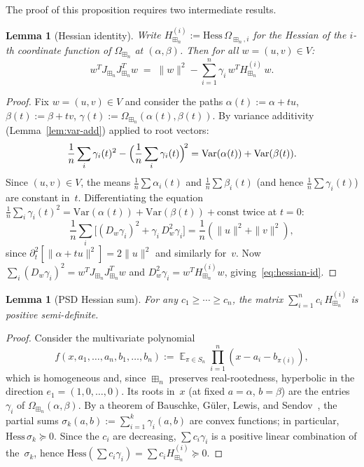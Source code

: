 \documentclass[10pt,a4paper]{amsart}
\theoremstyle{plain}
\newtheorem{lemma}[theorem]{Lemma}
\theoremstyle{definition}
\theoremstyle{remark}
\newcommand{\fp}{\boxplus_n}
\begin{document}
The proof of this proposition requires two
intermediate results.

\begin{lemma}[Hessian identity]
\label{lem:hessian-id}
Write $H^{(i)}_{\fp}:=\mathrm{Hess}\,\Omega_{\fp,i}$
for the Hessian of the $i$-th coordinate function
of $\Omega_{\fp}$ at $(\alpha,\beta)$.
Then for all $w=(u,v)\in V$:
\begin{equation}\label{eq:hessian-id}
  w^T J_{\fp}J_{\fp}^T w
  \;=\;\|w\|^2
  -\sum_{i=1}^n\gamma_i\,w^T H^{(i)}_{\fp}\,w.
\end{equation}
\end{lemma}

\begin{proof}
Fix $w=(u,v)\in V$ and consider the paths
$\alpha(t):=\alpha+tu$, $\beta(t):=\beta+tv$,
$\gamma(t):=\Omega_{\fp}(\alpha(t),\beta(t))$.
By variance additivity (Lemma~\ref{lem:var-add})
applied to root vectors:
\[
  \frac{1}{n}\sum_i\gamma_i(t)^2
  -\Bigl(\frac{1}{n}\sum_i\gamma_i(t)\Bigr)^{\!2}
  =\mathrm{Var}(\alpha(t))+\mathrm{Var}(\beta(t)).
\]
Since $(u,v)\in V$, the means
$\frac{1}{n}\sum\alpha_i(t)$
and $\frac{1}{n}\sum\beta_i(t)$
(and hence $\frac{1}{n}\sum\gamma_i(t)$) are
constant in~$t$.
Differentiating the equation
$\frac{1}{n}\sum_i\gamma_i(t)^2
=\mathrm{Var}(\alpha(t))+\mathrm{Var}(\beta(t))
+\mathrm{const}$
twice at $t=0$:
\[
  \frac{1}{n}\sum_i\bigl[
    (D_w\gamma_i)^2+\gamma_i\,D_w^2\gamma_i
  \bigr]
  =\frac{1}{n}(\|u\|^2+\|v\|^2),
\]
since $\partial_t^2[\|\alpha+tu\|^2]=2\|u\|^2$
and similarly for~$v$.
Now $\sum_i(D_w\gamma_i)^2=w^T J_{\fp}J_{\fp}^T w$
and $D_w^2\gamma_i=w^T H^{(i)}_{\fp}w$,
giving~\eqref{eq:hessian-id}.
\end{proof}

\begin{lemma}[PSD Hessian sum]
\label{lem:psd-hess}
For any $c_1\ge\cdots\ge c_n$,
the matrix $\sum_{i=1}^n c_i\,H^{(i)}_{\fp}$
is positive semi-definite.
\end{lemma}

\begin{proof}
Consider the multivariate polynomial
\[
  f(x,a_1,\ldots,a_n,b_1,\ldots,b_n)
  :=\mathop{\mathbb{E}}_{\pi\in S_n}
  \prod_{i=1}^n(x-a_i-b_{\pi(i)}),
\]
which is homogeneous and, since $\fp$ preserves
real-rootedness, hyperbolic in the direction
$e_1=(1,0,\ldots,0)$.
Its roots in~$x$ (at fixed $a=\alpha$, $b=\beta$)
are the entries $\gamma_i$ of
$\Omega_{\fp}(\alpha,\beta)$.
By a theorem of Bauschke, G\"uler, Lewis,
and Sendov~\cite{BGLS},
the partial sums
$\sigma_k(a,b):=\sum_{i=1}^k\gamma_i(a,b)$
are convex functions; in particular,
$\mathrm{Hess}\,\sigma_k\succeq 0$.
Since the $c_i$ are decreasing,
$\sum c_i\gamma_i$ is a positive linear
combination of the~$\sigma_k$,
hence $\mathrm{Hess}(\sum c_i\gamma_i)
=\sum c_i H^{(i)}_{\fp}\succeq 0$.
\end{proof}
\end{document}
